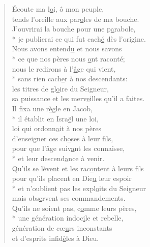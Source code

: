 
\begin{verse}
Écoute ma l\underline{o}i, ô mon peuple, \\
tends l’oreille aux par\underline{o}les de ma bouche. \\
J’ouvrirai la bouche pour une p\underline{a}rabole, \\*
je publierai ce qui fut cach\underline{é} dès l’origine. \\

Nous avons entend\underline{u} et nous savons \\*
ce que nos pères nous \underline{o}nt raconté; \\
nous le redirons à l’\underline{â}ge qui vient, \\*
sans rien cach\underline{e}r à nos descendants: \\
les titres de gl\underline{o}ire du Seigneur, \\
sa puissance et les merv\underline{e}illes qu’il a faites. \\

Il fixa une r\underline{è}gle en Jacob, \\*
il établit en Isra\underline{ë}l une loi, \\
loi qui ordonn\underline{a}it à nos pères \\
d’enseigner ces ch\underline{o}ses à leur fils, \\
pour que l’âge suiv\underline{a}nt les connaisse, \\*
et leur descend\underline{a}nce à venir. \\

Qu’ils se lèvent et les rac\underline{o}ntent à leurs fils \\
pour qu’ils placent en Die\underline{u} leur espoir \\*
et n’oublient pas les expl\underline{o}its du Seigneur \\
mais obs\underline{e}rvent ses commandements. \\

Qu’ils ne soient pas, c\underline{o}mme leurs pères, \\*
une génération indoc\underline{i}le et rebelle, \\
génération de cœ\underline{u}rs inconstants \\
et d’esprits infid\underline{è}les à Dieu. \\


\end{verse}
